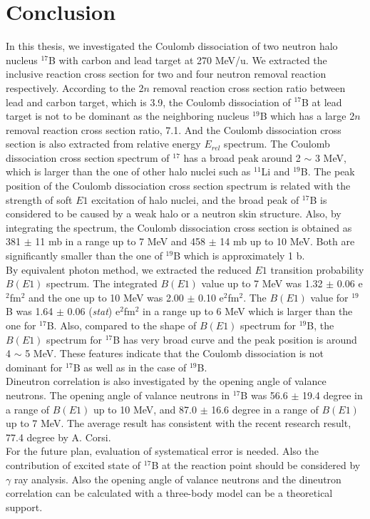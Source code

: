 \chapter{Conclusion}
In this thesis, we investigated the Coulomb dissociation of two neutron halo nucleus ${}^{17}$B with carbon and lead target at 270 MeV/u. We extracted the inclusive reaction cross section for two and four neutron removal reaction respectively. According to the 2$n$ removal reaction cross section ratio between lead and carbon target, which is 3.9, the Coulomb dissociation of $^{17}$B at lead target is not to be dominant as the neighboring nucleus $^{19}$B which has a large 2$n$ removal reaction cross section ratio, 7.1\cite{KJCook}. And the Coulomb dissociation cross section is also extracted from relative energy $E_{rel}$ spectrum. The Coulomb dissociation cross section spectrum of $^{17}$ has a broad peak around 2 $\sim$ 3 MeV, which is larger than the one of other halo nuclei such as ${}^{11}$Li\cite{Nakamura06} and $^{19}$B\cite{KJCook}. The peak position of the Coulomb dissociation cross section spectrum is related with the strength of soft $E1$ excitation of halo nuclei, and the broad peak of $^{17}$B is considered to be caused by a weak halo or a neutron skin structure. Also, by integrating the spectrum, the Coulomb dissociation cross section is obtained as 381 $\pm$ 11 mb in a range up to 7 MeV and 458 $\pm$ 14 mb up to 10 MeV. Both are significantly smaller than the one of ${}^{19}$B which is approximately 1 b\cite{KJCook}.\\
By equivalent photon method, we extracted the reduced $E1$ transition probability $B(E1)$ spectrum. The integrated $B(E1)$ value up to 7 MeV was 1.32 $\pm$ 0.06 e$^2$fm$^2$ and the one up to 10 MeV was 2.00 $\pm$ 0.10 e$^2$fm$^2$. The $B(E1)$ value for $^{19}$B was 1.64 $\pm$ 0.06 (\textit{stat}) e$^2$fm$^2$ in a range up to 6 MeV\cite{KJCook} which is larger than the one for $^{17}$B. Also, compared to the shape of $B(E1)$ spectrum for $^{19}$B, the $B(E1)$ spectrum for $^{17}$B has very broad curve and the peak position is around 4 $\sim$ 5 MeV. These features indicate that the Coulomb dissociation is not dominant for $^{17}$B as well as in the case of $^{19}$B. \\
Dineutron correlation is also investigated by the opening angle of valance neutrons. The opening angle of valance neutrons in $^{17}$B was 56.6 $\pm$ 19.4 degree in a range of $B(E1)$ up to 10 MeV, and 87.0 $\pm$ 16.6 degree in a range of $B(E1)$ up to 7 MeV. The average result has consistent with the recent research result, 77.4 degree by A. Corsi\cite{Corsi}. \\
For the future plan, evaluation of systematical error is needed. Also the contribution of excited state of $^{17}$B at the reaction point should be considered by $\gamma$ ray analysis. Also the opening angle of valance neutrons and the dineutron correlation can be calculated with a three-body model can be a theoretical support. 